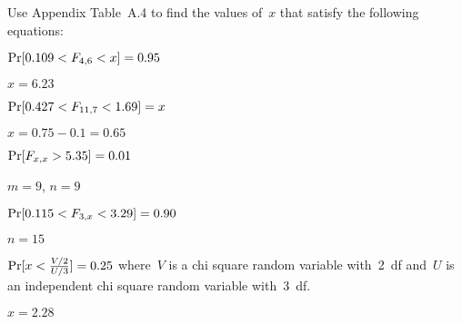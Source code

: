 \begin{problem}
   Use Appendix Table~A.4 to find the values of~$x$ that satisfy the following equations:
\end{problem}

\begin{subproblem}
  $\Pr\lbrack0.109 < F_{4,6} < x\rbrack = 0.95$
\end{subproblem}

${x = 6.23}$

\begin{subproblem}
  $\Pr\lbrack0.427 < F_{11,7} < 1.69\rbrack = x$
\end{subproblem}

${x = 0.75 - 0.1 = 0.65}$

\begin{subproblem}
  $\Pr\lbrack F_{x,x} > 5.35\rbrack = 0.01$
\end{subproblem}

${m = 9}$, ${n = 9}$

\begin{subproblem}
  $\Pr\lbrack0.115 < F_{3,x} < 3.29\rbrack = 0.90$
\end{subproblem}

${n = 15}$

\begin{subproblem}
  $\Pr\lbrack x < \frac{V/2}{U/3}\rbrack = 0.25$ where~$V$ is a chi square random variable with~2~df and~$U$ is an independent chi square random variable with~3~df.
\end{subproblem}

${x = 2.28}$
